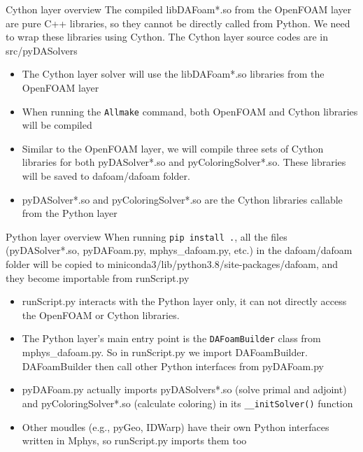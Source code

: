 \documentclass{bredelebeamer}
\begin{document}
\begin{frame}[fragile]{Cython layer overview}
The compiled libDAFoam*.so from the OpenFOAM layer are pure C++ libraries, so they cannot be directly called from Python. We need to wrap these libraries using Cython. The Cython layer source codes are in src/pyDASolvers
  \begin{itemize}
    \setlength\itemsep{1em}
    \item The Cython layer solver will use the libDAFoam*.so libraries from the OpenFOAM layer
    \item When running the \texttt{Allmake} command, both OpenFOAM and Cython libraries will be compiled
    \item Similar to the OpenFOAM layer, we will compile three sets of Cython libraries for both pyDASolver*.so and pyColoringSolver*.so. These libraries will be saved to dafoam/dafoam folder.
    \item pyDASolver*.so and pyColoringSolver*.so are the Cython libraries callable from the Python layer
    
  \end{itemize}
\end{frame}

\begin{frame}[fragile]{Python layer overview}
When running \texttt{pip install .}, all the files (pyDASolver*.so, pyDAFoam.py, mphys\_dafoam.py, etc.) in the dafoam/dafoam folder will be copied to miniconda3/lib/python3.8/site-packages/dafoam, and they become importable from runScript.py

\begin{itemize}
  \setlength\itemsep{1em}
    \item runScript.py interacts with the Python layer only, it can not directly access the OpenFOAM or Cython libraries.
    \item The Python layer's main entry point is the \texttt{DAFoamBuilder} class from mphys\_dafoam.py. So in runScript.py we import DAFoamBuilder. DAFoamBuilder then call other Python interfaces from pyDAFoam.py
    \item pyDAFoam.py actually imports pyDASolvers*.so (solve primal and adjoint) and pyColoringSolver*.so (calculate coloring) in its \texttt{\_\_initSolver()} function
    \item Other moudles (e.g., pyGeo, IDWarp) have their own Python interfaces written in Mphys, so runScript.py imports them too  
  \end{itemize}
\end{frame}
\end{document}
